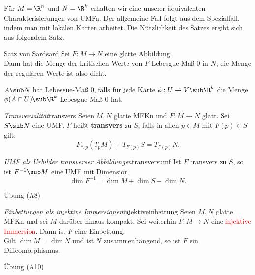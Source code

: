\begin{bemerkung}
Für $M = \R^n$ und $N= \R^k$ erhalten wir eine unserer äquivalenten Charakterisierungen von UMFn. Der allgemeine Fall folgt aus dem Spezialfall, indem man mit lokalen Karten arbeitet. Die Nützlichkeit des Satzes ergibt sich aus folgendem Satz.
\end{bemerkung}
\begin{satz}{Satz von Sard}{sard}
Sei $F: M \to N$ eine glatte Abbildung.\\
Dann hat die Menge der kritischen Werte von $F$ Lebesgue-Maß $0$ in $N$, die Menge der regulären Werte ist also dicht.
\end{satz}
\begin{bemerkung}
$A \sub N$ hat Lebesgue-Maß $0$, falls für jede Karte $\phi: U \to V \sub \R^k$ die Menge $\phi(A \cap U) \sub \R^k$ Lebesgue-Maß $0$ hat.
\end{bemerkung}
\begin{definition}{\textit{Transversalität}}{transvers}
Seien $M,N$ glatte MFKn und $F: M \to N$ glatt. Sei $S \sub N$ eine UMF. $F$ heißt \textbf{transvers} zu $S$, falls in allen $p \in M$ mit $F(p) \in S$ gilt:
\begin{equation}
F_{\ast, p} (T_pM) + T_{F(p)}S=T_{F(p)}N.
\end{equation}
\end{definition}
\begin{satz}{\textit{UMF als Urbilder transverser Abbildungen}}{transversumf}
Ist $F$ transvers zu $S$, so ist $F^{-1} \sub M$ eine UMF mit Dimension
\begin{equation}
\dim F^{-1} = \dim M + \dim S - \dim N.
\end{equation}
\end{satz}
\begin{beweis}
Übung (A8)
\end{beweis}
\begin{satz}{\textit{Einbettungen als injektive Immersionen}}{injektiveinbettung}
Seien $M,N$ glatte MFKn und sei $M$ darüber hinaus kompakt. Sei weiterhin $F: M \to N$ eine \textcolor{red}{injektive Immersion}. Dann ist $F$ eine Einbettung.\\
Gilt $\dim M = \dim N$ und ist $N$ zusammenhängend, so ist $F$ ein Diffeomorphismus.
\end{satz}
\begin{beweis}
Übung (A10)
\end{beweis}
